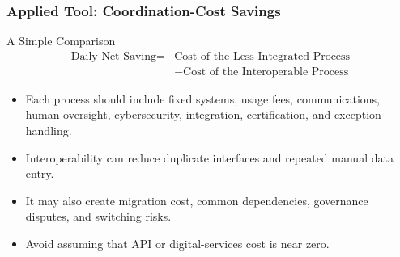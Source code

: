 \documentclass{beamer}
\begin{document}
\begin{frame}[t]
\frametitle{Applied Tool: Coordination-Cost Savings}
\begin{block}{A Simple Comparison}
\[
\begin{aligned}
\text{Daily Net Saving} = {} & \text{Cost of the Less-Integrated Process} \\
& {} - \text{Cost of the Interoperable Process}
\end{aligned}
\]
\end{block}
\begin{itemize}
\item Each process should include fixed systems, usage fees, communications, human oversight, cybersecurity, integration, certification, and exception handling.
\item Interoperability can reduce duplicate interfaces and repeated manual data entry.
\item It may also create migration cost, common dependencies, governance disputes, and switching risks.
\item Avoid assuming that API or digital-services cost is near zero.
\end{itemize}
\end{frame}
\end{document}
